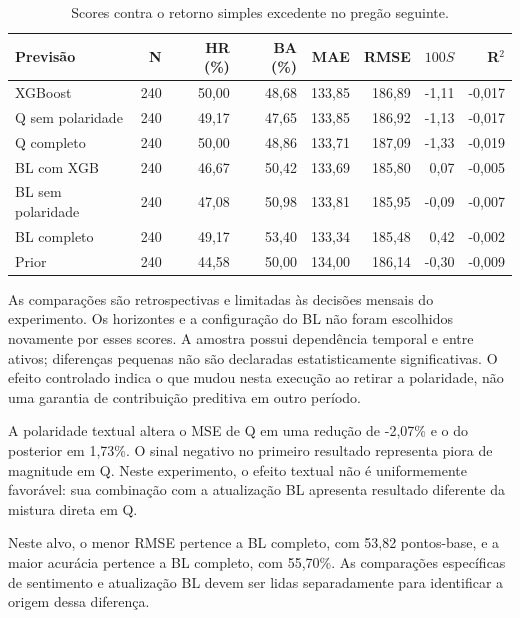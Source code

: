 \begin{table}[H]\centering
\caption{Scores contra o retorno simples excedente no pregão seguinte.}
{\footnotesize\begin{tabular}{lrrrrrrr}\hline
Previsão & N & HR (\%) & BA (\%) & MAE & RMSE & $100S$ & R$^2$\\ \hline
XGBoost & 240 & 50,00 & 48,68 & 133,85 & 186,89 & -1,11 & -0,017\\
Q sem polaridade & 240 & 49,17 & 47,65 & 133,85 & 186,92 & -1,13 & -0,017\\
Q completo & 240 & 50,00 & 48,86 & 133,71 & 187,09 & -1,33 & -0,019\\
BL com XGB & 240 & 46,67 & 50,42 & 133,69 & 185,80 & 0,07 & -0,005\\
BL sem polaridade & 240 & 47,08 & 50,98 & 133,81 & 185,95 & -0,09 & -0,007\\
BL completo & 240 & 49,17 & 53,40 & 133,34 & 185,48 & 0,42 & -0,002\\
Prior & 240 & 44,58 & 50,00 & 134,00 & 186,14 & -0,30 & -0,009\\
\hline\end{tabular}}\par{}\end{table}

As comparações são retrospectivas e limitadas às decisões mensais do experimento. Os horizontes e a configuração do BL não foram escolhidos novamente por esses scores. A amostra possui dependência temporal e entre ativos; diferenças pequenas não são declaradas estatisticamente significativas. O efeito controlado indica o que mudou nesta execução ao retirar a polaridade, não uma garantia de contribuição preditiva em outro período.

A polaridade textual altera o MSE de Q em uma redução de -2,07\% e o do posterior em 1,73\%. O sinal negativo no primeiro resultado representa piora de magnitude em Q. Neste experimento, o efeito textual não é uniformemente favorável: sua combinação com a atualização BL apresenta resultado diferente da mistura direta em Q.

Neste alvo, o menor RMSE pertence a BL completo, com 53,82 pontos-base, e a maior acurácia pertence a BL completo, com 55,70\%. As comparações específicas de sentimento e atualização BL devem ser lidas separadamente para identificar a origem dessa diferença.
